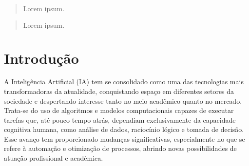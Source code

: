 \documentclass[english,brazilian]{UNISINOSartigo} %
\begin{document}
\capa
\folhaderosto


%
\begin{abstract}
Lorem ipsum.

\end{abstract}

\begin{otherlanguage}{english}
\singlespacing
\begin{abstract}
Lorem ipsum.
\end{abstract}
\end{otherlanguage}

\section{Introdução}

A Inteligência Artificial (IA) tem se consolidado como uma das tecnologias mais transformadoras da atualidade, conquistando espaço em diferentes setores da sociedade e despertando interesse tanto no meio acadêmico quanto no mercado. Trata-se do uso de algoritmos e modelos computacionais capazes de executar tarefas que, até pouco tempo atrás, dependiam exclusivamente da capacidade cognitiva humana, como análise de dados, raciocínio lógico e tomada de decisão. Esse avanço tem proporcionado mudanças significativas, especialmente no que se refere à automação e otimização de processos, abrindo novas possibilidades de atuação profissional e acadêmica.
\end{document}
